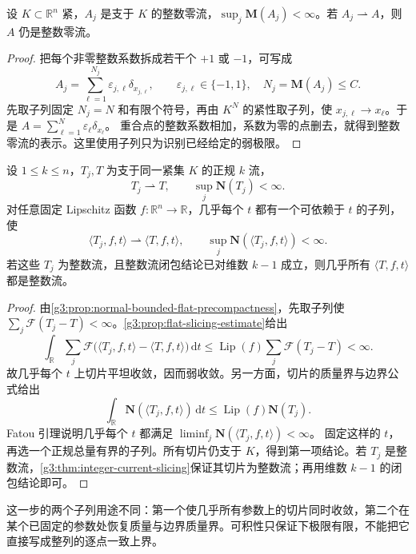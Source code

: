 \begin{lemma}\label{g3:lem:integer-zero-current-closure}
	设 \(K\subset\mathbb R^n\) 紧，\(A_j\) 是支于 \(K\) 的整数零流，\(\sup_j\mathbf M(A_j)<\infty\)。若 \(A_j\rightharpoonup A\)，则 \(A\) 仍是整数零流。
\end{lemma}
\begin{proof}
	把每个非零整数系数拆成若干个 \(+1\) 或 \(-1\)，可写成
	\[
		A_j=\sum_{\ell=1}^{N_j}\varepsilon_{j,\ell}\delta_{x_{j,\ell}},
		\qquad \varepsilon_{j,\ell}\in\{-1,1\},\quad
		N_j=\mathbf M(A_j)\le C.
	\]
	先取子列固定 \(N_j=N\) 和有限个符号，再由 \(K^N\) 的紧性取子列，使 \(x_{j,\ell}\to x_\ell\)。于是
	\(A=\sum_{\ell=1}^N\varepsilon_\ell\delta_{x_\ell}\)。
	重合点的整数系数相加，系数为零的点删去，就得到整数零流的表示。这里使用子列只为识别已经给定的弱极限。
\end{proof}

\begin{lemma}\label{g3:lem:slice-closure-subsequence}
	设 \(1\le k\le n\)，\(T_j,T\) 为支于同一紧集 \(K\) 的正规 \(k\) 流，
	\[
		T_j\rightharpoonup T,\qquad \sup_j\mathbf N(T_j)<\infty.
	\]
	对任意固定 Lipschitz 函数 \(f:\mathbb R^n\to\mathbb R\)，几乎每个 \(t\) 都有一个可依赖于 \(t\) 的子列，使
	\[
		\langle T_j,f,t\rangle\rightharpoonup\langle T,f,t\rangle,
		\qquad
		\sup_j\mathbf N(\langle T_j,f,t\rangle)<\infty.
	\]
	若这些 \(T_j\) 为整数流，且整数流闭包结论已对维数 \(k-1\) 成立，则几乎所有 \(\langle T,f,t\rangle\) 都是整数流。
\end{lemma}
\begin{proof}
	由\cref{g3:prop:normal-bounded-flat-precompactness}，先取子列使
	\(\sum_j\mathcal F(T_j-T)<\infty\)。\cref{g3:prop:flat-slicing-estimate}给出
	\[
		\int_{\mathbb R}\sum_j
		\mathcal F\bigl(\langle T_j,f,t\rangle-\langle T,f,t\rangle\bigr)\,\mathrm dt
		\le\operatorname{Lip}(f)\sum_j\mathcal F(T_j-T)<\infty.
	\]
	故几乎每个 \(t\) 上切片平坦收敛，因而弱收敛。另一方面，切片的质量界与边界公式给出
	\[
		\int_{\mathbb R}
		\mathbf N(\langle T_j,f,t\rangle)\,\mathrm dt
		\le\operatorname{Lip}(f)\mathbf N(T_j).
	\]
	Fatou 引理说明几乎每个 \(t\) 都满足
	\(\liminf_j\mathbf N(\langle T_j,f,t\rangle)<\infty\)。
	固定这样的 \(t\)，再选一个正规总量有界的子列。所有切片仍支于 \(K\)，得到第一项结论。若 \(T_j\) 是整数流，\cref{g3:thm:integer-current-slicing}保证其切片为整数流；再用维数 \(k-1\) 的闭包结论即可。
\end{proof}

这一步的两个子列用途不同：第一个使几乎所有参数上的切片同时收敛，第二个在某个已固定的参数处恢复质量与边界质量界。可积性只保证下极限有限，不能把它直接写成整列的逐点一致上界。


